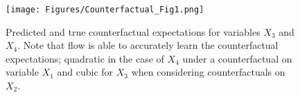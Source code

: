 \documentclass[]{article}
\begin{document}
\begin{figure}[ht]
	\vskip 0.2in
	\begin{center}
		\centerline{\texttt{[image: Figures/Counterfactual\_Fig1.png]}}
		\caption{Predicted and true counterfactual expectations  for variables $X_3$ and $X_4$. Note that 
			flow is able to accurately learn the counterfactual expectations; 
			quadratic in the case of  $X_4$ under a counterfactual on variable $X_1$ and 
			cubic for $X_3$ when considering counterfactuals on $X_2$.   }
		\label{Fig:counterfactualExample1}
	\end{center}
	\vskip -0.2in
\end{figure}


\newpage 


\end{document}
